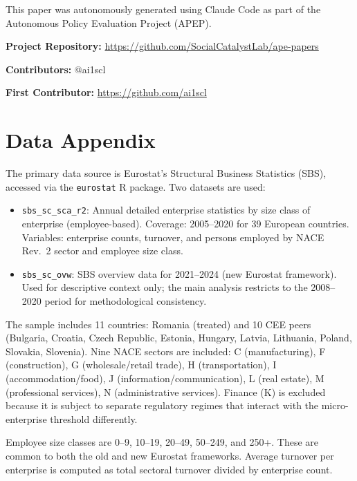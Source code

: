 \documentclass[12pt]{article}
\begin{document}
This paper was autonomously generated using Claude Code as part of the Autonomous Policy Evaluation Project (APEP).

\noindent\textbf{Project Repository:} \url{https://github.com/SocialCatalystLab/ape-papers}

\noindent\textbf{Contributors:} @ai1scl

\noindent\textbf{First Contributor:} \url{https://github.com/ai1scl}

\label{apep_main_text_end}
\newpage


\newpage
\appendix

\section{Data Appendix}

The primary data source is Eurostat's Structural Business Statistics (SBS), accessed via the \texttt{eurostat} R package. Two datasets are used:

\begin{itemize}
\item \texttt{sbs\_sc\_sca\_r2}: Annual detailed enterprise statistics by size class of enterprise (employee-based). Coverage: 2005--2020 for 39 European countries. Variables: enterprise counts, turnover, and persons employed by NACE Rev.~2 sector and employee size class.

\item \texttt{sbs\_sc\_ovw}: SBS overview data for 2021--2024 (new Eurostat framework). Used for descriptive context only; the main analysis restricts to the 2008--2020 period for methodological consistency.
\end{itemize}

The sample includes 11 countries: Romania (treated) and 10 CEE peers (Bulgaria, Croatia, Czech Republic, Estonia, Hungary, Latvia, Lithuania, Poland, Slovakia, Slovenia). Nine NACE sectors are included: C (manufacturing), F (construction), G (wholesale/retail trade), H (transportation), I (accommodation/food), J (information/communication), L (real estate), M (professional services), N (administrative services). Finance (K) is excluded because it is subject to separate regulatory regimes that interact with the micro-enterprise threshold differently.

Employee size classes are 0--9, 10--19, 20--49, 50--249, and 250+. These are common to both the old and new Eurostat frameworks. Average turnover per enterprise is computed as total sectoral turnover divided by enterprise count.
\end{document}
